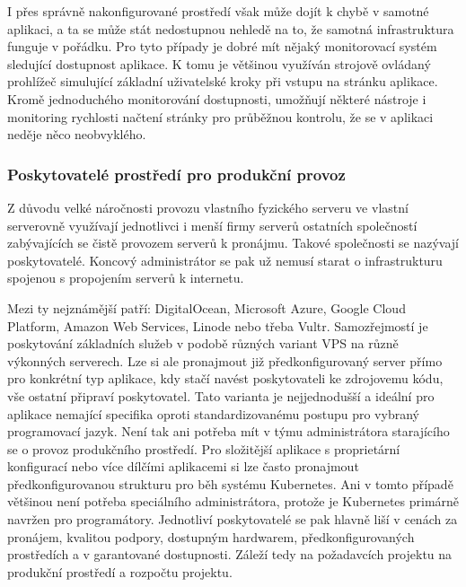 		I přes správně nakonfigurované prostředí však může dojít k chybě v samotné aplikaci, a ta se může stát nedostupnou
		nehledě na to, že samotná infrastruktura funguje v pořádku.
		Pro tyto případy je dobré mít nějaký monitorovací systém sledující dostupnost aplikace.
		K tomu je většinou využíván strojově ovládaný prohlížeč simulující základní uživatelské kroky při vstupu na stránku
		aplikace.
		Kromě jednoduchého monitorování dostupnosti, umožňují některé nástroje i monitoring rychlosti načtení stránky pro
		průběžnou kontrolu, že se v aplikaci neděje něco neobvyklého.

		\subsubsection{Poskytovatelé prostředí pro produkční provoz}

		Z důvodu velké náročnosti provozu vlastního fyzického serveru ve vlastní serverovně využívají jednotlivci i menší firmy
		serverů ostatních společností zabývajících se čistě provozem serverů k pronájmu.
		Takové společnosti se nazývají poskytovatelé.
		Koncový administrátor se pak už nemusí starat o infrastrukturu spojenou s propojením serverů k internetu.

		Mezi ty nejznámější patří: DigitalOcean, Microsoft Azure, Google Cloud Platform, Amazon Web Services,
		Linode nebo třeba Vultr.
		Samozřejmostí je poskytování základních služeb v podobě různých variant \Ac{VPS} na různě výkonných serverech.
		Lze si ale pronajmout již předkonfigurovaný server přímo pro konkrétní typ aplikace, kdy stačí navést poskytovateli
		ke zdrojovemu kódu, vše ostatní připraví poskytovatel.
		Tato varianta je nejjednodušší a ideální pro aplikace nemající specifika oproti standardizovanému postupu
		pro vybraný programovací jazyk.
		Není tak ani potřeba mít v týmu administrátora starajícího se o provoz produkčního prostředí.
		Pro složitější aplikace s proprietární konfigurací nebo více dílčími aplikacemi si lze často pronajmout
		předkonfigurovanou strukturu pro běh systému Kubernetes.
		Ani v tomto případě většinou není potřeba speciálního administrátora, protože je Kubernetes primárně navržen
		pro programátory.
		Jednotliví poskytovatelé se pak hlavně liší v cenách za pronájem, kvalitou podpory, dostupným hardwarem, předkonfigurovaných
		prostředích a v garantované dostupnosti.
		Záleží tedy na požadavcích projektu na produkční prostředí a rozpočtu projektu.

